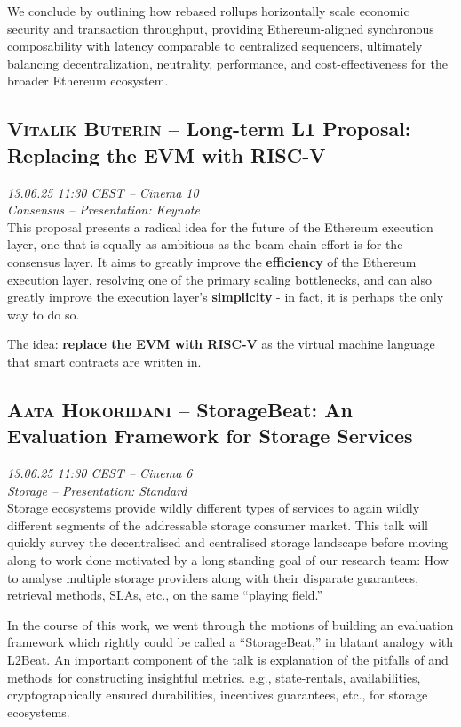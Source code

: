 We conclude by outlining how rebased rollups horizontally scale economic security and transaction throughput, providing Ethereum-aligned synchronous composability with latency comparable to centralized sequencers, ultimately balancing decentralization, neutrality, performance, and cost-effectiveness for the broader Ethereum ecosystem.

\clearpage
\subsection {\textsc{Vitalik Buterin}  -- Long-term L1 Proposal: Replacing the EVM with RISC-V} \noindent \textit {13.06.25 11:30 CEST -- Cinema 10\\ Consensus -- Presentation: Keynote}\\[1em] This proposal presents a radical idea for the future of the Ethereum execution layer, one that is equally as ambitious as the beam chain effort is for the consensus layer. It aims to greatly improve the \textbf{efficiency} of the Ethereum execution layer, resolving one of the primary scaling bottlenecks, and can also greatly improve the execution layer's \textbf{simplicity} - in fact, it is perhaps the only way to do so.

The idea: \textbf{replace the EVM with RISC-V} as the virtual machine language that smart contracts are written in.

\clearpage
\subsection {\textsc{Aata Hokoridani}  -- StorageBeat: An Evaluation Framework for Storage Services} \noindent \textit {13.06.25 11:30 CEST -- Cinema 6\\ Storage -- Presentation: Standard}\\[1em] Storage ecosystems provide wildly different types of services to again wildly different segments of the addressable storage consumer market. This talk will quickly survey the decentralised and centralised storage landscape before moving along to work done motivated by a long standing goal of our research team: How to analyse multiple storage providers along with their disparate guarantees, retrieval methods, SLAs, etc., on the same ``playing field.''

In the course of this work, we went through the motions of building an evaluation framework which rightly could be called a ``StorageBeat,'' in blatant analogy with L2Beat. An important component of the talk is explanation of the pitfalls of and methods for constructing insightful metrics. e.g., state-rentals, availabilities, cryptographically ensured durabilities, incentives guarantees, etc., for storage ecosystems.


